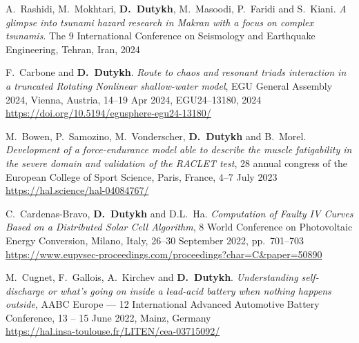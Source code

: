 \documentclass[final, a4paper, oneside, 12pt]{article}
\numberwithin{equation}{section}
\begin{document}
\begin{etaremune}
  \item A.~Rashidi, M.~Mokhtari, \textbf{D.~Dutykh}, M.~Masoodi, P.~Faridi and S.~Kiani. \textit{A glimpse into tsunami hazard research in Makran with a focus on complex tsunamis}. The 9 International Conference on Seismology and Earthquake Engineering, Tehran, Iran, 2024 %

  \item F.~Carbone and \textbf{D.~Dutykh}. \textit{Route to chaos and resonant triads interaction in a truncated Rotating Nonlinear shallow-water model}, EGU General Assembly 2024, Vienna, Austria, 14--19 Apr 2024, EGU24--13180, 2024 \\ %
  \url{https://doi.org/10.5194/egusphere-egu24-13180/}



  \item M.~Bowen, P.~Samozino, M.~Vonderscher, \textbf{D.~Dutykh} and B.~Morel. \textit{Development of a force-endurance model able to describe the muscle fatigability in the severe domain and validation of the RACLET test}, 28 annual congress of the European College of Sport Science, Paris, France, 4--7 July 2023 \\ %
  \url{https://hal.science/hal-04084767/}



  \item C.~Cardenas-Bravo, \textbf{D.~Dutykh} and D.L.~Ha. \textit{Computation of Faulty IV Curves Based on a Distributed Solar Cell Algorithm}, 8 World Conference on Photovoltaic Energy Conversion, Milano, Italy, 26--30 September 2022, pp.~701--703 \\ %
  \url{https://www.eupvsec-proceedings.com/proceedings?char=C&paper=50890}
  
  \item M.~Cugnet, F.~Gallois, A.~Kirchev and \textbf{D.~Dutykh}. \textit{Understanding self-discharge or what's going on inside a lead-acid battery when nothing happens outside}, AABC Europe --- 12 International Advanced Automotive Battery Conference, 13 -- 15 June 2022, Mainz, Germany \\
  \url{https://hal.insa-toulouse.fr/LITEN/cea-03715092/}
  

\end{etaremune}
\end{document}
